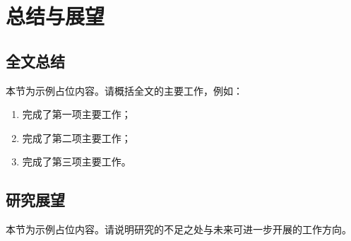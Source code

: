 \chapter{总结与展望}\label{chap:conclusion}

\section{全文总结}
本节为示例占位内容。请概括全文的主要工作，例如：
\begin{enumerate}[label={（\arabic*）},leftmargin=*]
  \item 完成了第一项主要工作；
  \item 完成了第二项主要工作；
  \item 完成了第三项主要工作。
\end{enumerate}

\section{研究展望}
本节为示例占位内容。请说明研究的不足之处与未来可进一步开展的工作方向。
